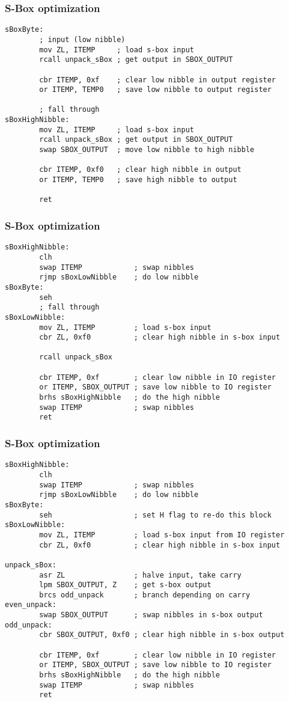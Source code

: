 \documentclass{beamer}
\begin{document}
\begin{frame}[fragile]
\frametitle{S-Box optimization}
\begin{lstlisting}
sBoxByte:
        ; input (low nibble)
        mov ZL, ITEMP     ; load s-box input
        rcall unpack_sBox ; get output in SBOX_OUTPUT

        cbr ITEMP, 0xf    ; clear low nibble in output register
        or ITEMP, TEMP0   ; save low nibble to output register

        ; fall through
sBoxHighNibble:
        mov ZL, ITEMP     ; load s-box input
        rcall unpack_sBox ; get output in SBOX_OUTPUT
        swap SBOX_OUTPUT  ; move low nibble to high nibble

        cbr ITEMP, 0xf0   ; clear high nibble in output
        or ITEMP, TEMP0   ; save high nibble to output

        ret
\end{lstlisting}
\end{frame}

\begin{frame}[fragile]
\frametitle{S-Box optimization}
\begin{lstlisting}
sBoxHighNibble:
        clh
        swap ITEMP            ; swap nibbles
        rjmp sBoxLowNibble    ; do low nibble
sBoxByte:
        seh
        ; fall through
sBoxLowNibble:
        mov ZL, ITEMP         ; load s-box input
        cbr ZL, 0xf0          ; clear high nibble in s-box input

        rcall unpack_sBox

        cbr ITEMP, 0xf        ; clear low nibble in IO register
        or ITEMP, SBOX_OUTPUT ; save low nibble to IO register
        brhs sBoxHighNibble   ; do the high nibble
        swap ITEMP            ; swap nibbles
        ret
\end{lstlisting}
\end{frame}

\begin{frame}[fragile]
\frametitle{S-Box optimization}
\begin{lstlisting}
sBoxHighNibble:
        clh
        swap ITEMP            ; swap nibbles
        rjmp sBoxLowNibble    ; do low nibble
sBoxByte:
        seh                   ; set H flag to re-do this block
sBoxLowNibble:
        mov ZL, ITEMP         ; load s-box input from IO register
        cbr ZL, 0xf0          ; clear high nibble in s-box input

unpack_sBox:
        asr ZL                ; halve input, take carry
        lpm SBOX_OUTPUT, Z    ; get s-box output
        brcs odd_unpack       ; branch depending on carry
even_unpack:
        swap SBOX_OUTPUT      ; swap nibbles in s-box output
odd_unpack:
        cbr SBOX_OUTPUT, 0xf0 ; clear high nibble in s-box output

        cbr ITEMP, 0xf        ; clear low nibble in IO register
        or ITEMP, SBOX_OUTPUT ; save low nibble to IO register
        brhs sBoxHighNibble   ; do the high nibble
        swap ITEMP            ; swap nibbles
        ret
\end{lstlisting}
\end{frame}
\end{document}

